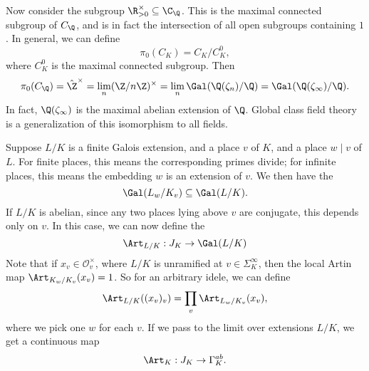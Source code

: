 \documentclass[a4paper]{article}
\begin{document}
Now consider the subgroup $\R^\times_{>0} \subseteq \C_\Q$. This is the maximal connected subgroup of $C_\Q$, and is in fact the intersection of all open subgroups containing $1$. In general, we can define
\[
  \pi_0(C_K) = C_K/C_K^0,
\]
where $C_K^0$ is the maximal connected subgroup. Then
\[
  \pi_0(C_\Q) = \hat{\Z}^\times = \lim_n (\Z/n\Z)^\times = \lim_n \Gal(\Q(\zeta_n)/\Q) = \Gal(\Q(\zeta_\infty)/\Q).
\]
In fact, $\Q(\zeta_\infty)$ is the maximal abelian extension of $\Q$. Global class field theory is a generalization of this isomorphism to all fields.

Suppose $L/K$ is a finite Galois extension, and a place $v$ of $K$, and a place $w \mid v$ of $L$. For finite places, this means the corresponding primes divide; for infinite places, this means the embedding $w$ is an extension of $v$. We then have the 
\[
  \Gal(L_w/K_v) \subseteq \Gal(L/K).
\]
If $L/K$ is abelian, since any two places lying above $v$ are conjugate, this depends only on $v$. In this case, we can now define the 
\[
  \Art_{L/K}: J_K \to \Gal(L/K)
\]
Note that if $x_v \in \mathcal{O}_v^\times$, where $L/K$ is unramified at $v \in \Sigma_K^\infty$, then the local Artin map $\Art_{K_w/K_v}(x_v) = 1$. So for an arbitrary idele, we can define
\[
  \Art_{L/K}((x_v)_v) = \prod_v \Art_{L_w/K_v} (x_v),
\]
where we pick one $w$ for each $v$. If we pass to the limit over extensions $L/K$, we get a continuous map
\[
  \Art_K : J_K \to \Gamma_K^{ab}.
\]
\end{document}
